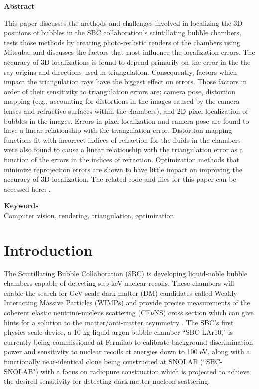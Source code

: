 \documentclass[11pt, letterpaper]{extarticle} %
\begin{document}
\begin{titlingpage}
\centerline{\textbf{Abstract}}
\hspace{0.1\parindent} This paper discusses the methods and challenges involved in localizing the 3D positions of bubbles in the SBC collaboration's scintillating bubble chambers, tests those methods by creating photo-realistic renders of the chambers using Mitsuba, and discusses the factors that most influence the localization errors. The accuracy of 3D localizations is found to depend primarily on the error in the the ray origins and directions used in triangulation. Consequently, factors which impact the triangulation rays have the biggest effect on errors. Those factors in order of their sensitivity to triangulation errors are: camera pose, distortion mapping (e.g., accounting for distortions in the images caused by the camera lenses and refractive surfaces within the chambers), and 2D pixel localization of bubbles in the images. Errors in pixel localization and camera pose are found to have a linear relationship with the triangulation error. Distortion mapping functions fit with incorrect indices of refraction for the fluids in the chambers were also found to cause a linear relationship with the triangulation error as a function of the errors in the indices of refraction. Optimization methods that minimize reprojection errors are shown to have little impact on improving the accuracy of 3D localization. The related code and files for this paper can be accessed here: .

\vspace{1cm}

\centering
\textbf{Keywords}\\
Computer vision, rendering, triangulation, optimization 

\end{titlingpage}

\newpage
\tableofcontents
\newpage


\section{Introduction} \label{sec:introduction}
The Scintillating Bubble Collaboration (SBC) is developing liquid-noble bubble chambers capable of detecting sub-keV nuclear recoils. These chambers will enable the search for GeV-scale dark matter (DM) candidates called Weakly Interacting Massive Particles (WIMPs) and provide precise measurements of the coherent elastic neutrino-nucleus scattering (CE$\nu$NS) cross section which can give hints for a solution to the matter/anti-matter asymmetry \cite{alfonso2023scintillating, alfonso2022snowmass}. The SBC's first physics-scale device, a 10-kg liquid argon bubble chamber ``SBC-LAr10," is currently being commissioned at Fermilab to calibrate background discrimination power and sensitivity to nuclear recoils at energies down to 100 eV, along with a functionally near-identical clone being constructed at SNOLAB (``SBC-SNOLAB") with a focus on radiopure construction which is projected to achieve the desired sensitivity for detecting dark matter-nucleon scattering. 
\end{document}
